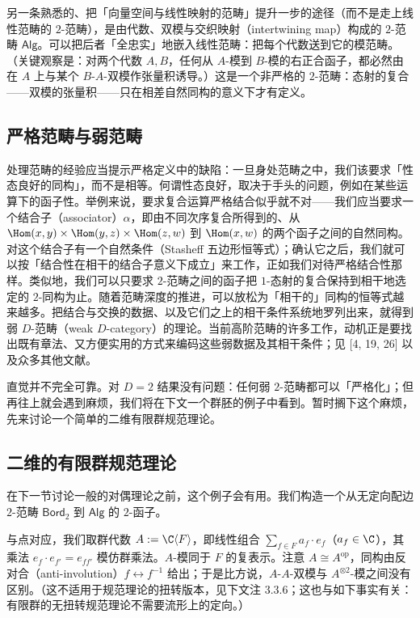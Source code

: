 \begin{remark}
另一条熟悉的、把「向量空间与线性映射的范畴」提升一步的途径（而不是走上线性范畴的 $2$-范畴），是由代数、双模与交织映射（intertwining map）构成的 $2$-范畴 $\mathsf{Alg}$。可以把后者「全忠实」地嵌入线性范畴：把每个代数送到它的模范畴。（关键观察是：对两个代数 $A,B$，任何从 $A$-模到 $B$-模的右正合函子，都必然由在 $A$ 上与某个 $B$-$A$-双模作张量积诱导。）这是一个非严格的 $2$-范畴：态射的复合——双模的张量积——只在相差自然同构的意义下才有定义。
\end{remark}

\subsection{严格范畴与弱范畴}

处理范畴的经验应当提示严格定义中的缺陷：一旦身处范畴之中，我们该要求「性态良好的同构」，而不是相等。何谓性态良好，取决于手头的问题，例如在某些运算下的函子性。举例来说，要求复合运算严格结合似乎就不对——我们应当要求一个结合子（associator）$\alpha$，即由不同次序复合所得到的、从 $\Hom(x,y)\times\Hom(y,z)\times\Hom(z,w)$ 到 $\Hom(x,w)$ 的两个函子之间的自然同构。对这个结合子有一个自然条件（Stasheff 五边形恒等式）；确认它之后，我们就可以按「结合性在相干的结合子意义下成立」来工作，正如我们对待严格结合性那样。类似地，我们可以只要求 $2$-范畴之间的函子把 $1$-态射的复合保持到相干地选定的 $2$-同构为止。随着范畴深度的推进，可以放松为「相干的」同构的恒等式越来越多。把结合与交换的数据、以及它们之上的相干条件系统地罗列出来，就得到弱 $D$-范畴（weak $D$-category）的理论。当前高阶范畴的许多工作，动机正是要找出既有章法、又方便实用的方式来编码这些弱数据及其相干条件；见 [4, 19, 26] 以及众多其他文献。

直觉并不完全可靠。对 $D=2$ 结果没有问题：任何弱 $2$-范畴都可以「严格化」；但再往上就会遇到麻烦，我们将在下文一个群胚的例子中看到。暂时搁下这个麻烦，先来讨论一个简单的二维有限群规范理论。

\subsection{二维的有限群规范理论}

在下一节讨论一般的对偶理论之前，这个例子会有用。我们构造一个从无定向配边 $2$-范畴 $\mathsf{Bord}_2$ 到 $\mathsf{Alg}$ 的 $2$-函子。

与点对应，我们取群代数 $A:=\C\langle F\rangle$，即线性组合 $\sum_{f\in F}a_f\cdot e_f$（$a_f\in\C$），其乘法 $e_f\cdot e_{f'}=e_{ff'}$ 模仿群乘法。$A$-模同于 $F$ 的复表示。注意 $A\cong A^{\mathrm{op}}$，同构由反对合（anti-involution）$f\leftrightarrow f^{-1}$ 给出；于是比方说，$A$-$A$-双模与 $A^{\otimes 2}$-模之间没有区别。（这不适用于规范理论的扭转版本，见下文注 3.3.6；这也与如下事实有关：有限群的无扭转规范理论不需要流形上的定向。）

